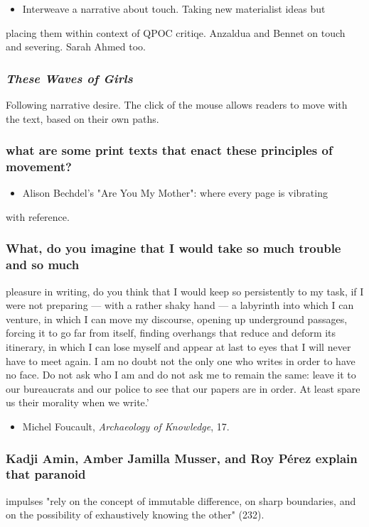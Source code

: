 \documentclass[11pt]{article}
\begin{document}
\begin{itemize}
\item Interweave a narrative about touch. Taking new materialist ideas but
\end{itemize}
placing them within context of QPOC critiqe. Anzaldua and Bennet on
touch and severing. Sarah Ahmed too. 

\subsubsection{\emph{These Waves of Girls}}
\label{sec:orgb151ad8}
Following narrative desire. The click of the mouse allows readers to
move with the text, based on their own paths. 

\subsubsection{what are some print texts that enact these principles of movement?}
\label{sec:orga6ceb0b}
\begin{itemize}
\item Alison Bechdel's "Are You My Mother": where every page is vibrating
\end{itemize}
with reference. 

\subsubsection{What, do you imagine that I would take so much trouble and so much}
\label{sec:orge340de3}
pleasure in writing, do you think that I would keep so persistently to my task, if I were not preparing — with a rather shaky hand — a labyrinth into which I can venture, in which I can move my discourse, opening up underground passages, forcing it to go far from itself, finding overhangs that reduce and deform its itinerary, in which I can lose myself and appear at last to eyes that I will never have to meet again. I am no doubt not the only one who writes in order to have no face. Do not ask who I am and do not ask me to remain the same: leave it to our bureaucrats and our police to see that our papers are in order. At least spare us their morality when we write.’
\begin{itemize}
\item Michel Foucault, \emph{Archaeology of Knowledge}, 17.
\end{itemize}

\subsubsection{Kadji Amin, Amber Jamilla Musser, and Roy Pérez explain that paranoid}
\label{sec:orgfcea760}
impulses "rely on the concept of immutable difference, on sharp
boundaries, and on the possibility of exhaustively knowing the other"
(232).
\end{document}
